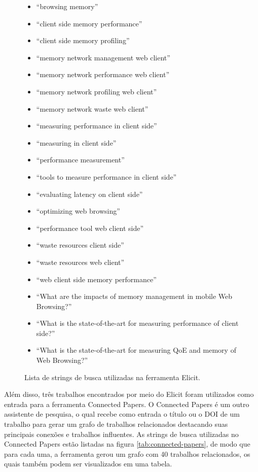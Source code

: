 \documentclass[12pt]{tcc}
\begin{document}
\begin{figure}
	\centering
	\caption{Lista de strings de busca utilizadas na ferramenta Elicit.}
	\begin{minipage}{0.6\textwidth}
	    \begin{itemize}
			\item ``browsing memory''
			\item ``client side memory performance''
			\item ``client side memory profiling''
			\item ``memory network management web client''
			\item ``memory network performance web client''
			\item ``memory network profiling web client''
			\item ``memory network waste web client''
			\item ``measuring performance in client side''
			\item ``measuring in client side''
			\item ``performance measurement''
			\item ``tools to measure performance in client side''
			\item ``evaluating latency on client side''
			\item ``optimizing web browsing''
			\item ``performance tool web client side''
			\item ``waste resources client side''
			\item ``waste resources web client''
			\item ``web client side memory performance''
			\item ``What are the impacts of memory management in mobile Web Browsing?''
			\item ``What is the state-of-the-art for measuring performance of client side?''
			\item ``What is the state-of-the-art for measuring QoE and memory of Web Browsing?''
	    \end{itemize}
	\end{minipage}
	\label{fig:elicit}
\end{figure}

Além disso, três trabalhos encontrados por meio do Elicit foram utilizados como entrada para a ferramenta Connected Papers.
O Connected Papers é um outro assistente de pesquisa, o qual recebe como entrada o título ou o DOI de um trabalho para gerar um grafo de trabalhos relacionados destacando suas principais conexões e trabalhos influentes.
As strings de busca utilizadas no Connected Papers estão listadas na figura \ref{tab:connected-papers}, de modo que para cada uma, a ferramenta gerou um grafo com 40 trabalhos relacionados, os quais também podem ser visualizados em uma tabela.
\end{document}
